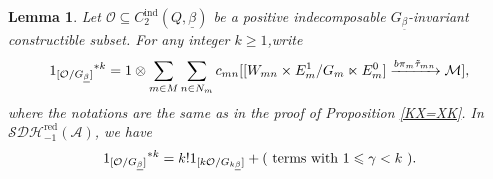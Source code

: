 \documentclass[12pt]{amsart}
\newtheorem{lemma}[theorem]{Lemma}
\theoremstyle{definition}
\numberwithin{equation}{section}
\begin{document}
\begin{lemma}
    \label{O^k in C2A+}
    Let $ \mathcal{O} \subseteq  C_2^{\mathrm{ind}}(Q,\underline{\beta}) $ be a positive indecomposable $ G_{\underline{\beta}} $-invariant constructible subset. 
    For any integer  $ k \geqslant 1 $,write
    \begin{align*}      {1_{[\mathcal{O}/G_{\underline{\beta}}]}}^{*k}  = 1 \otimes \sum_{m \in M}\sum_{n \in N_m}c_{mn}[[W_{mn} \times E_m^1/G_m \ltimes E_m^0] \xrightarrow{b \pi_m \Tilde{\tau}_{mn}}\mathcal{M}],
    \end{align*}
    where the notations are the same as in the proof of Proposition \ref{KX=XK}. 
    In $ \mathcal{SDH}_{-1}^{\mathrm{red}}(\mathcal{A}) $, we have
    \begin{align*}
         {1_{[\mathcal{O}/G_{\underline{\beta}}]}}^{*k}  = k! 1_{[k\mathcal{O}/G_{k\underline{\beta}}]} + (\text{ terms with $ 1 \leqslant \gamma <k $ } ).
    \end{align*}   
\end{lemma}
\end{document}

